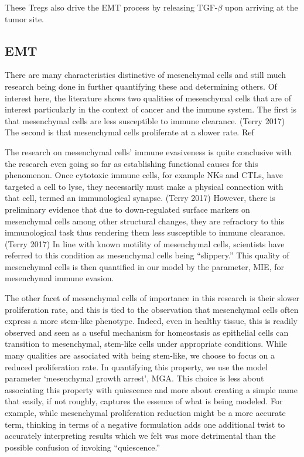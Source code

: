 \documentclass{article}
\begin{document}
These Tregs also drive the EMT process by releasing TGF-$\beta$ upon arriving at the tumor site.

\subsection{EMT}\label{EMT}
There are many characteristics distinctive of mesenchymal cells and still much research being done in further quantifying these and determining others.
Of interest here, the literature shows two qualities of mesenchymal cells that are of interest particularly in the context of cancer and the immune system.
The first is that mesenchymal cells are less susceptible to immune clearance. (Terry 2017) 
The second is that mesenchymal cells proliferate at a slower rate. Ref %

The research on mesenchymal cells' immune evasiveness is quite conclusive with the research even going so far as establishing functional causes for this phenomenon.
Once cytotoxic immune cells, for example NKs and CTLs, have targeted a cell to lyse, they necessarily must make a physical connection with that cell, termed an immunological synapse. (Terry 2017) 
However, there is preliminary evidence that due to down-regulated surface markers on mesenchymal cells among other structural changes, they are refractory to this immunological task thus rendering them less susceptible to immune clearance. (Terry 2017) %
In line with known motility of mesenchymal cells, scientists have referred to this condition as mesenchymal cells being ``slippery.''
This quality of mesenchymal cells is then quantified in our model by the parameter, MIE, for mesenchymal immune evasion.

The other facet of mesenchymal cells of importance in this research is their slower proliferation rate, and this is tied to the observation that mesenchymal cells often express a more stem-like phenotype.
Indeed, even in healthy tissue, this is readily observed and seen as a useful mechanism for homeostasis as epithelial cells can transition to mesenchymal, stem-like cells under appropriate conditions.
While many qualities are associated with being stem-like, we choose to focus on a reduced proliferation rate.
In quantifying this property, we use the model parameter `mesenchymal growth arrest', MGA.
This choice is less about associating this property with quiescence and more about creating a simple name that easily, if not roughly, captures the essence of what is being modeled.
For example, while mesenchymal proliferation reduction might be a more accurate term, thinking in terms of a negative formulation adds one additional twist to accurately interpreting results which we felt was more detrimental than the possible confusion of invoking ``quiescence.''
\end{document}
